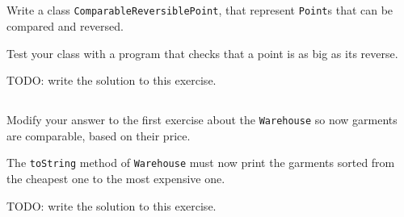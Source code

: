 \documentclass[a4paper, 11pt]{article}
\begin{document}
\subsection{}

Write a class \texttt{ComparableReversiblePoint}, that represent
\texttt{Point}s that can be compared and reversed.

Test your class with a program that checks that a point is as big as its reverse.

\begin{solution}
TODO: write the solution to this exercise.
\end{solution}


\subsection{}

Modify your answer to the first exercise about the \texttt{Warehouse} so now
garments are comparable, based on their price.

The \texttt{toString} method of \texttt{Warehouse} must now print the garments
sorted from the cheapest one to the most expensive one.

\begin{solution}
TODO: write the solution to this exercise.
\end{solution}
\end{document}
